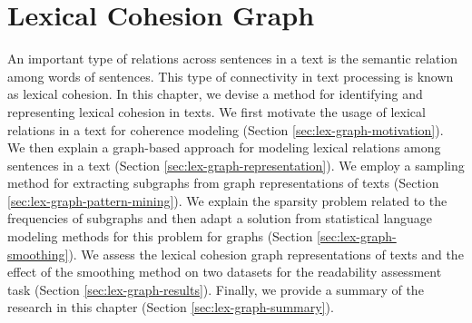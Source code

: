 
\chapter{Lexical Cohesion Graph}
\label{ch:lex-graph}

An important type of relations across sentences in a text is the semantic relation among words of sentences. 
This type of connectivity in text processing is known as lexical cohesion. 
In this chapter, we devise a method for identifying and representing lexical cohesion in texts. 
We first motivate the usage of lexical relations in a text for coherence modeling (Section \ref{sec:lex-graph-motivation}). 
We then explain a graph-based approach for modeling lexical relations among sentences in a text (Section \ref{sec:lex-graph-representation}). 
We employ a sampling method for extracting subgraphs from graph representations of texts (Section \ref{sec:lex-graph-pattern-mining}). 
We explain the sparsity problem related to the frequencies of subgraphs and then adapt a solution from statistical language modeling methods for this problem for graphs (Section \ref{sec:lex-graph-smoothing}). 
We assess the lexical cohesion graph representations of texts  and the effect of the smoothing method on two datasets for the readability assessment task (Section \ref{sec:lex-graph-results}). 
Finally, we provide a summary of the research in this chapter (Section \ref{sec:lex-graph-summary}).

